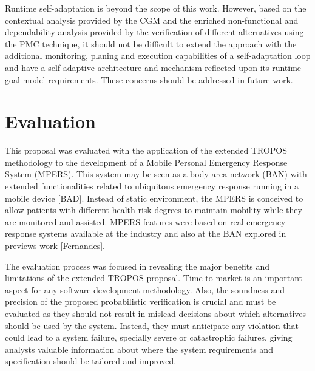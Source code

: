 Runtime self-adaptation is beyond the scope of this work. However, based on the contextual analysis provided by the CGM and the enriched non-functional and dependability analysis provided by the verification of different alternatives using the PMC technique, it should not be difficult to extend the approach with the additional monitoring, planing and execution capabilities of a self-adaptation loop and have a self-adaptive architecture and mechanism reflected upon its runtime goal model requirements. These concerns should be addressed in future work.




\section{Evaluation}

This proposal was evaluated with the application of the extended TROPOS methodology to the development of a Mobile Personal Emergency Response System (MPERS). This system may be seen as a body area network (BAN) with extended functionalities related to ubiquitous emergency response running in a mobile device [BAD]. Instead of static environment, the MPERS is conceived to allow patients with different health risk degrees to maintain mobility while they are monitored and assisted. MPERS features were based on real emergency response systems available at the industry and also at the BAN explored in previews work [Fernandes]. 


The evaluation process was focused in revealing the major benefits and limitations of the extended TROPOS proposal. Time to market is an important aspect for any software development methodology. Also, the soundness and precision of the proposed probabilistic verification is crucial and must be evaluated as they should not result in mislead decisions about which alternatives should be used by the system. Instead, they must anticipate any violation that could lead to a system failure, specially severe or catastrophic failures, giving analysts valuable information about where the system requirements and specification should be tailored and improved.

